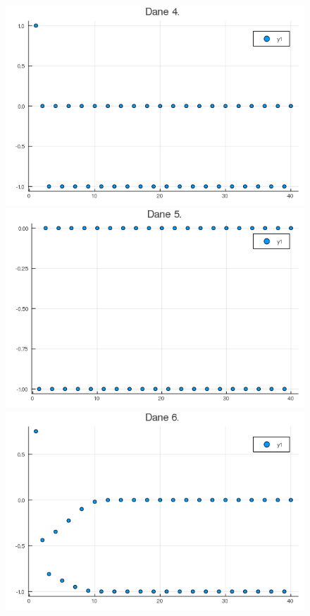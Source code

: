 \documentclass{article}
\begin{document}
\begin{figure}[h]
\begin{minipage}{0.40\textwidth}
  \end{minipage}
  \begin{minipage}{0.40\textwidth}
    \centering
    \includegraphics[width=\linewidth]{plot4}
  \end{minipage}
  \begin{minipage}{0.40\textwidth}
    \centering
    \includegraphics[width=\linewidth]{plot5}
  \end{minipage}
  \begin{minipage}{0.40\textwidth}
    \centering
    \includegraphics[width=\linewidth]{plot6}

\end{minipage}
\end{figure}
\end{document}
